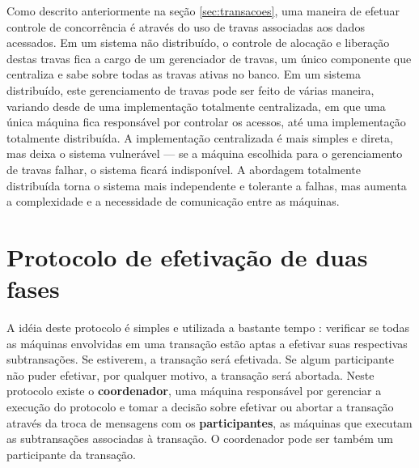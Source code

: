 \documentclass[11pt,twoside,a4paper]{book}
\begin{document}

Como descrito anteriormente na seção \ref{sec:transacoes}, uma maneira de efetuar controle de concorrência é através do uso de travas associadas aos dados acessados. Em um sistema não distribuído, o controle de alocação e liberação destas travas fica a cargo de um gerenciador de travas, um único componente que centraliza e sabe sobre todas as travas ativas no banco. Em um sistema distribuído, este gerenciamento de travas pode ser feito de várias maneira, variando desde de uma implementação totalmente centralizada, em que uma única máquina fica responsável por controlar os acessos, até uma implementação totalmente distribuída. A implementação centralizada é mais simples e direta, mas deixa o sistema vulnerável --- se a máquina escolhida para o gerenciamento de travas falhar, o sistema ficará indisponível. A abordagem totalmente distribuída torna o sistema mais independente e tolerante a falhas, mas aumenta a complexidade e a necessidade de comunicação entre as máquinas.

\section{Protocolo de efetivação de duas fases}
\label{sec:2pc}
A idéia deste protocolo é simples e utilizada a bastante tempo \cite{2pc}: verificar se todas as máquinas envolvidas em uma transação estão aptas a efetivar suas respectivas subtransações. Se estiverem, a transação será efetivada. Se algum participante não puder efetivar, por qualquer motivo, a transação será abortada. Neste protocolo existe o \textbf{coordenador}, uma máquina responsável por gerenciar a execução do protocolo e tomar a decisão sobre efetivar ou abortar a transação através da troca de mensagens com os \textbf{participantes}, as máquinas que executam as subtransações associadas à transação. O coordenador pode ser também um participante da transação.
\end{document}
